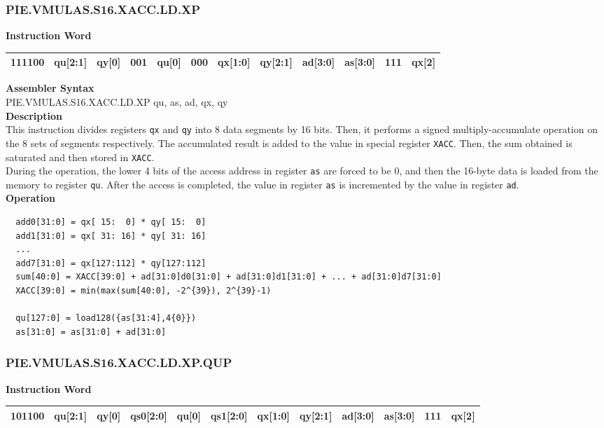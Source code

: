 \newpage
\subsubsection{PIE.VMULAS.S16.XACC.LD.XP}\label{instruction:PIEVMULASS16XACCLDXP}
\setlength\tabcolsep{6pt}
\textbf{Instruction Word} \\
\begin{tabular}{|c|c|c|c|c|c|c|c|c|c|c|c|}
	\hline
	111100 & qu[2:1] & qy[0] & 001 & qu[0] & 000 & qx[1:0] & qy[2:1] & ad[3:0] & as[3:0] & 111 & qx[2] \\
	\hline
\end{tabular}

\textbf{Assembler Syntax} \\
PIE.VMULAS.S16.XACC.LD.XP qu, as, ad, qx, qy \\
\textbf{Description} \\
This instruction divides registers \lstinline{qx} and \lstinline{qy} into 8 data segments by 16 bits. Then, it performs a signed multiply-accumulate operation on the 8 sets of segments respectively. The accumulated result is added to the value in special register \lstinline{XACC}. Then, the sum obtained is saturated and then stored in \lstinline{XACC}.\\
During the operation, the lower 4 bits of the access address in register \lstinline{as} are forced to be 0, and then the 16-byte data is loaded from the memory to register \lstinline{qu}. After the access is completed, the value in register \lstinline{as} is incremented by the value in register \lstinline{ad}.\\
\textbf{Operation}
\begin{lstlisting}
  add0[31:0] = qx[ 15:  0] * qy[ 15:  0]
  add1[31:0] = qx[ 31: 16] * qy[ 31: 16]
  ...
  add7[31:0] = qx[127:112] * qy[127:112]
  sum[40:0] = XACC[39:0] + ad[31:0]d0[31:0] + ad[31:0]d1[31:0] + ... + ad[31:0]d7[31:0]
  XACC[39:0] = min(max(sum[40:0], -2^{39}), 2^{39}-1)

  qu[127:0] = load128({as[31:4],4{0}})
  as[31:0] = as[31:0] + ad[31:0]
\end{lstlisting}

\newpage
\subsubsection{PIE.VMULAS.S16.XACC.LD.XP.QUP}\label{instruction:PIEVMULASS16XACCLDXPQUP}
\setlength\tabcolsep{6pt}
\textbf{Instruction Word} \\
\begin{tabular}{|c|c|c|c|c|c|c|c|c|c|c|c|}
	\hline
	101100 & qu[2:1] & qy[0] & qs0[2:0] & qu[0] & qs1[2:0] & qx[1:0] & qy[2:1] & ad[3:0] & as[3:0] & 111 & qx[2] \\
	\hline
\end{tabular}

